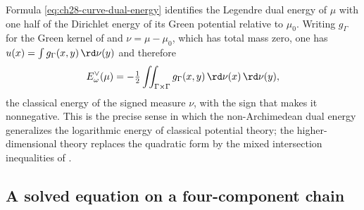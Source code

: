 \begin{remark}
\label{rem:ch28-classical-energy}
Formula \eqref{eq:ch28-curve-dual-energy} identifies the Legendre dual
energy of $\mu$ with one half of the Dirichlet energy of its Green
potential relative to $\mu_0$.  Writing $g_\Gamma$ for the Green kernel
of  and $\nu=\mu-\mu_0$, which has total mass
zero, one has $u(x)=\int g_\Gamma(x,y)\,\rd\nu(y)$ and therefore
\[
 E^\vee_\omega(\mu)
 =-\tfrac12\iint_{\Gamma\times\Gamma}
    g_\Gamma(x,y)\,\rd\nu(x)\,\rd\nu(y),
\]
the classical energy of the signed measure $\nu$, with the sign that makes
it nonnegative.  This is the precise sense in which the non-Archimedean dual
energy generalizes the logarithmic energy of classical potential theory; the
higher-dimensional theory replaces the quadratic form by the mixed
intersection inequalities of .
\end{remark}

\subsection{A solved equation on a four-component chain}
\label{sec:ch28-chain}

